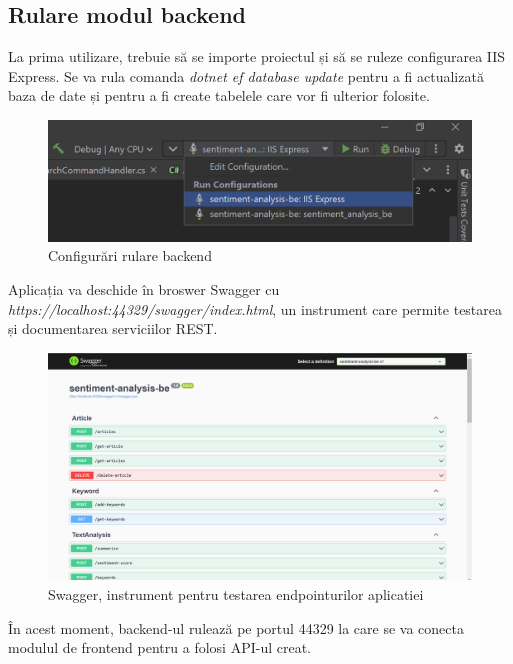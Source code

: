 \subsection{Rulare modul backend}
La prima utilizare, trebuie să se importe proiectul și să se ruleze configurarea IIS Express. Se va rula comanda {\it dotnet ef database update} pentru a fi actualizată baza de date și pentru a fi create tabelele care vor fi ulterior folosite.
\begin{figure}[ht]
	\centering
	\includegraphics[width=150mm]{figs/configBackend.png}
    \caption{Configurări rulare backend}
	\label{fig:configBackend}
\end{figure}

Aplicația va deschide în broswer Swagger cu {\it https://localhost:44329/swagger/index.html}, un instrument care permite testarea și documentarea serviciilor REST.
\begin{figure}[H]
	\centering
	\includegraphics[width=150mm]{figs/swagger.png}
    \caption{Swagger, instrument pentru testarea endpointurilor aplicatiei}
	\label{fig:swagger}
\end{figure}
În acest moment, backend-ul rulează pe portul 44329 la care se va conecta modulul de frontend pentru a folosi API-ul creat.
